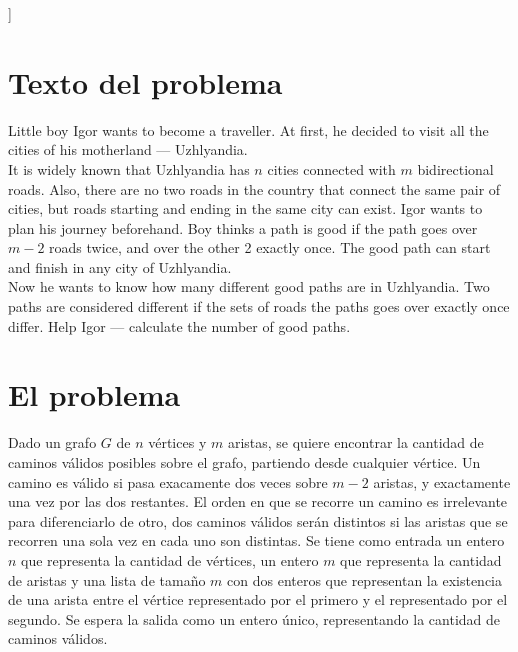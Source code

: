 \documentclass[a4paper,12pt,twocolumn]{article}
\begin{document}



\vspace{0.8cm}
]



\section{Texto del problema}
Little boy Igor wants to become a traveller. At first, he decided to visit all the cities of his motherland — Uzhlyandia.\\

It is widely known that Uzhlyandia has $n$ cities connected with $m$ bidirectional roads. Also, there are no two roads in the country that connect the same pair of cities, but roads starting and ending in the same city can exist. Igor wants to plan his journey beforehand. Boy thinks a path is good if the path goes over $m-2$ roads twice, and over the other 2 exactly once. The good path can start and finish in any city of Uzhlyandia.\\

Now he wants to know how many different good paths are in Uzhlyandia. Two paths are considered different if the sets of roads the paths goes over exactly once differ. Help Igor — calculate the number of good paths.\\

\section{El problema}

  Dado un grafo $G$ de $n$ vértices y $m$ aristas, se quiere encontrar la cantidad de caminos válidos posibles sobre el grafo, partiendo desde cualquier vértice. Un camino es válido si pasa exacamente dos veces sobre $m-2$ aristas, y exactamente una vez por las dos restantes. El orden en que se recorre un camino es irrelevante para diferenciarlo de otro, dos caminos válidos serán distintos si las aristas que se recorren una sola vez en cada uno son distintas.
  Se tiene como entrada un entero $n$ que representa la cantidad de vértices, un entero $m$ que representa la cantidad de aristas y una lista de tamaño $m$ con dos enteros que representan la existencia de una arista entre el vértice representado por el primero y el representado por el segundo.
  Se espera la salida como un entero único, representando la cantidad de caminos válidos.  
  
\end{document}
